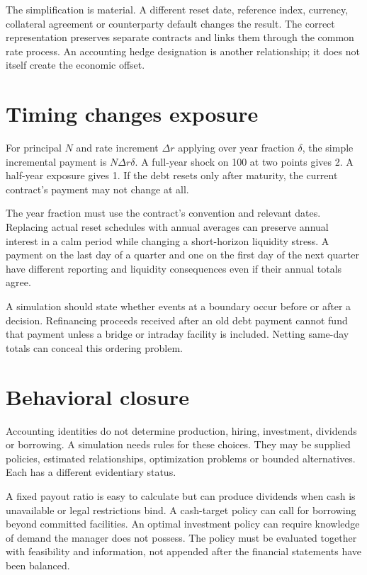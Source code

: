 The simplification is material. A different reset date, reference index, currency, collateral agreement or counterparty default changes the result. The correct representation preserves separate contracts and links them through the common rate process. An accounting hedge designation is another relationship; it does not itself create the economic offset.

\section{Timing changes exposure}
For principal $N$ and rate increment $\Delta r$ applying over year fraction $\delta$, the simple incremental payment is $N\Delta r\delta$. A full-year shock on 100 at two points gives 2. A half-year exposure gives 1. If the debt resets only after maturity, the current contract's payment may not change at all.

The year fraction must use the contract's convention and relevant dates. Replacing actual reset schedules with annual averages can preserve annual interest in a calm period while changing a short-horizon liquidity stress. A payment on the last day of a quarter and one on the first day of the next quarter have different reporting and liquidity consequences even if their annual totals agree.

A simulation should state whether events at a boundary occur before or after a decision. Refinancing proceeds received after an old debt payment cannot fund that payment unless a bridge or intraday facility is included. Netting same-day totals can conceal this ordering problem.

\section{Behavioral closure}
Accounting identities do not determine production, hiring, investment, dividends or borrowing. A simulation needs rules for these choices. They may be supplied policies, estimated relationships, optimization problems or bounded alternatives. Each has a different evidentiary status.

A fixed payout ratio is easy to calculate but can produce dividends when cash is unavailable or legal restrictions bind. A cash-target policy can call for borrowing beyond committed facilities. An optimal investment policy can require knowledge of demand the manager does not possess. The policy must be evaluated together with feasibility and information, not appended after the financial statements have been balanced.

